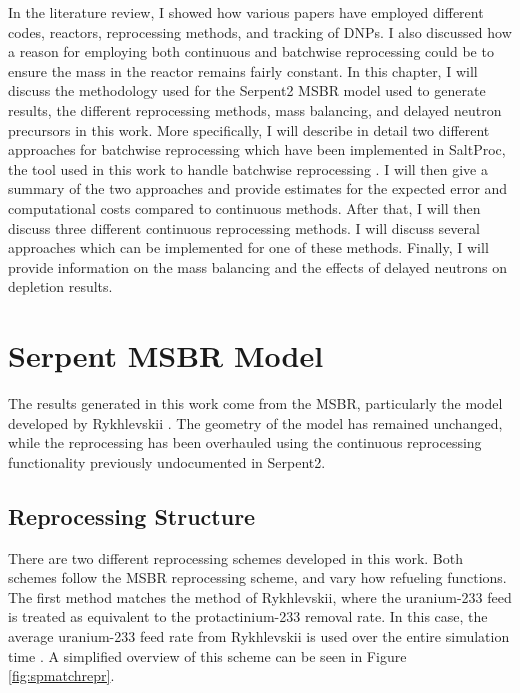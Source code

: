 \renewcommand*\descriptionlabel[1]{\hspace\leftmargin$#1$}
\setcounter{tocdepth}{5}
\setcounter{secnumdepth}{5}




In the literature review, I showed how various papers have employed different codes, reactors, reprocessing methods, and tracking of DNPs. I also discussed how a reason for employing both continuous and batchwise reprocessing could be to ensure the mass in the reactor remains fairly constant. In this chapter, I will discuss the methodology used for the Serpent2 MSBR model used to generate results, the different reprocessing methods, mass balancing, and delayed neutron precursors in this work.
More specifically, I will describe in detail two different approaches for batchwise reprocessing which have been implemented in SaltProc, the tool used in this work to handle batchwise reprocessing \cite{rykhlevskii_saltproc_2018}. I will then give a summary of the two approaches and provide estimates for the expected error and computational costs compared to continuous methods.
After that, I will then discuss three different continuous reprocessing methods.
I will discuss several approaches which can be implemented for one of these methods.
Finally, I will provide information on the mass balancing and the effects of delayed neutrons on depletion results.


\section{Serpent MSBR Model}

The results generated in this work come from the MSBR, particularly the model developed by Rykhlevskii \cite{rykhlevskii_advanced_2018}. The geometry of the model has remained unchanged, while the reprocessing has been overhauled using the continuous reprocessing functionality previously undocumented in Serpent2. %

\subsection{Reprocessing Structure}
\label{s:decay-tank}

There are two different reprocessing schemes developed in this work. Both schemes follow the MSBR reprocessing scheme, and vary how refueling functions. The first method matches the method of Rykhlevskii, where the uranium-233 feed is treated as equivalent to the protactinium-233 removal rate. In this case, the average uranium-233 feed rate from Rykhlevskii is used over the entire simulation time \cite{rykhlevskii_advanced_2018}. A simplified overview of this scheme can be seen in Figure \ref{fig:spmatchrepr}.


